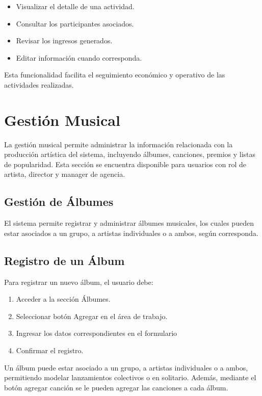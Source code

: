 \documentclass[12pt,a4paper,spanish,oneside]{article}
\begin{document}
	\begin{itemize}
		\item Visualizar el detalle de una actividad.
		\item Consultar los participantes asociados.
		\item Revisar los ingresos generados.
		\item Editar información cuando corresponda.
	\end{itemize}
	
	Esta funcionalidad facilita el seguimiento económico y operativo de las actividades realizadas.
	
	
	\section{Gestión Musical}
	
	La gestión musical permite administrar la información relacionada con la producción artística del sistema, incluyendo álbumes, canciones, premios y listas de popularidad. Esta sección se encuentra disponible para usuarios con rol de artista, director y manager de agencia.
	
	\subsection{Gestión de Álbumes}
	
	El sistema permite registrar y administrar álbumes musicales, los cuales pueden estar asociados a un grupo, a artistas individuales o a ambos, según corresponda.
	
	\subsection{Registro de un Álbum}
	
	Para registrar un nuevo álbum, el usuario debe:
	
	\begin{enumerate}
		\item Acceder a la sección Álbumes.
		\item Seleccionar botón Agregar en el área de trabajo.
		\item Ingresar los datos correspondientes en el formulario
		\item Confirmar el registro.
	\end{enumerate}
	
	Un álbum puede estar asociado a un grupo, a artistas individuales o a ambos, permitiendo modelar lanzamientos colectivos o en solitario.
	Además, mediante el botón agregar canción se le pueden agregar las canciones a cada álbum.
	
\end{document}
